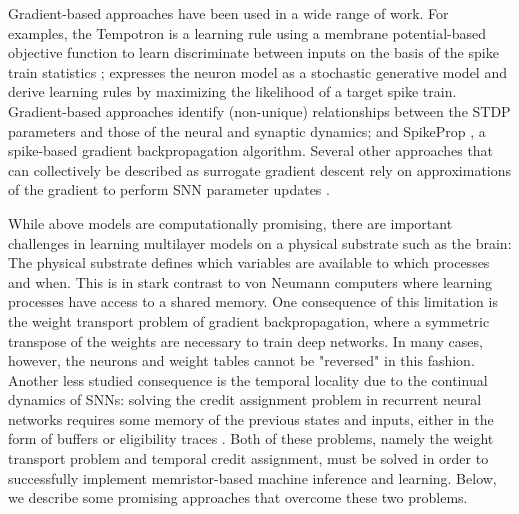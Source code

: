 \documentclass[english]{article}
\renewcommand{\cite}{\citep}
\begin{document}
Gradient-based approaches have been used in a wide range of work. For examples, the Tempotron is a learning rule using a membrane potential-based objective function to learn discriminate between inputs on the basis of the spike train statistics \cite{Gutig_Sompolinsky06_tempneur}; \cite{Pfister_etal06_optispik} expresses the neuron model as a stochastic generative model and derive learning rules by maximizing the likelihood of a target spike train. Gradient-based approaches identify (non-unique) relationships between the \ac{STDP} parameters and those of the neural and synaptic dynamics; and SpikeProp \cite{Bohte_etal00_spikback}, a spike-based gradient backpropagation algorithm. Several other approaches that can collectively be described as surrogate gradient descent \cite{Neftci_etal19_surrgrad} rely on approximations of the gradient to perform \ac{SNN} parameter updates \cite{Huh_Sejnowski17_graddesc,Shrestha_Orchard18_slayspik,Anwani_Rajendran15_normappr,Zenke_Ganguli17_supesupe}.

While above models are computationally promising, there are important challenges in learning multilayer models on a physical substrate such as the brain: The physical substrate defines which variables are available to which processes and when. 
This is in stark contrast to von Neumann computers where learning processes have access to a shared memory. One consequence of this limitation is the weight transport problem of gradient backpropagation, where a symmetric transpose of the weights are necessary to train deep networks. In many cases, however, the neurons and weight tables cannot be "reversed" in this fashion. Another less studied consequence is the temporal locality due to the continual dynamics of \acp{SNN}: solving the credit assignment problem in recurrent neural networks requires some memory of the previous states and inputs, either in the form of buffers or eligibility traces \cite{Williams_Zipser89_learalgo}. 
Both of these problems, namely the weight transport problem and temporal credit assignment, must be solved in order to successfully implement memristor-based machine inference and learning.
Below, we describe some promising approaches that overcome these two problems. 
\end{document}
